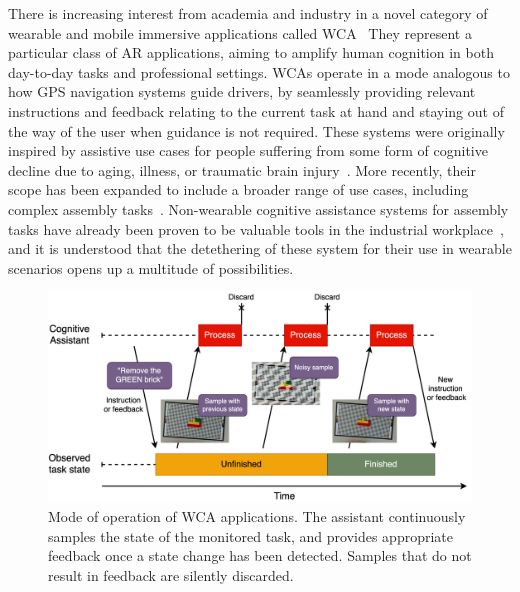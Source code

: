 There is increasing interest from academia and industry in a novel category of wearable and mobile immersive applications called \gls{WCA}~\cite{ha2014towards,chen2018application,chen2015early,belletier2021wearable,chen2017empirical,wang2020scaling,chatzopoulos2017hyperion}
They represent a particular class of \gls{AR} applications, aiming to amplify human cognition in both day-to-day tasks and professional settings.
\glspl{WCA} operate in a mode analogous to how \gls{GPS} navigation systems guide drivers, by seamlessly providing relevant instructions and feedback relating to the current task at hand and staying out of the way of the user when guidance is not required.
These systems were originally inspired by assistive use cases for people suffering from some form of cognitive decline due to aging, illness, or traumatic brain injury~\cite{ha2014towards,satyanarayanan2019augmenting}.
More recently, their scope has been expanded to include a broader range of use cases, including complex assembly tasks~\cite{chen2017empirical,chen2018application,wang2020scaling,wang2019towards,ha2014towards}.
Non-wearable cognitive assistance systems for assembly tasks have already been proven to be valuable tools in the industrial workplace~\cite{funk2015cognitive,gorecky2011cognito}, and it is understood that the detethering of these system for their use in wearable scenarios opens up a multitude of possibilities.

\begin{figure}
    \centering
    \includegraphics[width=.9\textwidth]{Figs/wca_state}
    \caption{%
        Mode of operation of \gls{WCA} applications.
        The assistant continuously samples the state of the monitored task, and provides appropriate feedback once a state change has been detected.
        Samples that do not result in feedback are silently discarded.
    }\label{fig:wca}
\end{figure}

